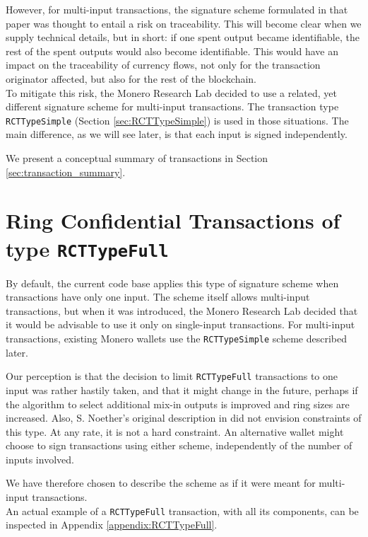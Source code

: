 However, for multi-input transactions, the signature scheme formulated in that paper was thought to entail a risk on traceability. This will become clear when we supply technical details, but in short: if one spent output became identifiable, the rest of the spent outputs would also become identifiable. This would have an impact on the traceability of currency flows, not only for the transaction originator affected, but also for the rest of the blockchain.
\\

To mitigate this risk, the Monero Research Lab decided to use a related, yet different signature scheme for multi-input transactions. The transaction type {\tt RCTTypeSimple} (Section \ref{sec:RCTTypeSimple}) is used in those situations. The main difference, as we will see later, is that each input is signed independently.

We present a conceptual summary of transactions in Section \ref{sec:transaction_summary}.


\section{Ring Confidential Transactions of type {\tt RCTTypeFull}}
\label{sec:RCTTypeFull}

By default, the current code base applies this type of signature scheme when transactions have only one input. The scheme itself allows multi-input transactions, but when it was introduced, the Monero Research Lab decided that it would be advisable to use it only on single-input transactions. For multi-input transactions, existing Monero wallets use the {\tt RCTTypeSimple} scheme described later.

Our perception is that the decision to limit {\tt RCTTypeFull} transactions to one input was rather hastily taken, and that it might change in the future, perhaps if the algorithm to select additional mix-in outputs is improved and ring sizes are increased. Also, S. Noether’s original description in \cite{ledger34} did not envision constraints of this type. At any rate, it is not a hard constraint. An alternative wallet might choose to sign transactions using either scheme, independently of the number of inputs involved.

We have therefore chosen to describe the scheme as if it were meant for multi-input transactions.
\\

An actual example of a {\tt RCTTypeFull} transaction, with all its components, can be inspected in Appendix \ref{appendix:RCTTypeFull}.


